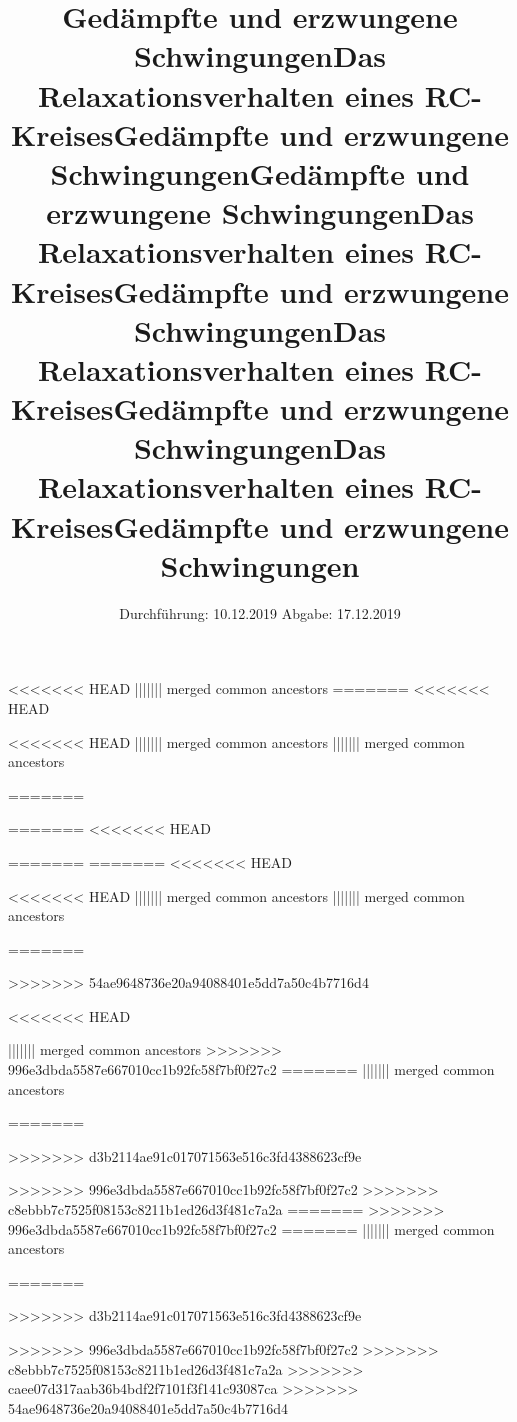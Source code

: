 

\subject{Versuch 354}
<<<<<<< HEAD
||||||| merged common ancestors
=======
<<<<<<< HEAD
\subject{Versuch 354}
\title{Gedämpfte und erzwungene Schwingungen}
<<<<<<< HEAD
||||||| merged common ancestors
||||||| merged common ancestors
\subject{Versuch 353}
\title{Das Relaxationsverhalten eines RC-Kreises}
=======
\subject{Versuch 353}
=======
<<<<<<< HEAD
\title{Gedämpfte und erzwungene Schwingungen}
=======
=======
<<<<<<< HEAD
\subject{Versuch 354}
\title{Gedämpfte und erzwungene Schwingungen}
<<<<<<< HEAD
||||||| merged common ancestors
||||||| merged common ancestors
\subject{Versuch 353}
\title{Das Relaxationsverhalten eines RC-Kreises}
=======
\subject{Versuch 353}
>>>>>>> 54ae9648736e20a94088401e5dd7a50c4b7716d4
\title{Gedämpfte und erzwungene Schwingungen}
<<<<<<< HEAD

||||||| merged common ancestors
>>>>>>> 996e3dbda5587e667010cc1b92fc58f7bf0f27c2
=======
||||||| merged common ancestors
\subject{Versuch 353}
\title{Das Relaxationsverhalten eines RC-Kreises}
=======
\subject{Versuch 353}
>>>>>>> d3b2114ae91c017071563e516c3fd4388623cf9e
\title{Gedämpfte und erzwungene Schwingungen}
>>>>>>> 996e3dbda5587e667010cc1b92fc58f7bf0f27c2
>>>>>>> c8ebbb7c7525f08153c8211b1ed26d3f481c7a2a
=======
>>>>>>> 996e3dbda5587e667010cc1b92fc58f7bf0f27c2
=======
||||||| merged common ancestors
\subject{Versuch 353}
\title{Das Relaxationsverhalten eines RC-Kreises}
=======
\subject{Versuch 353}
>>>>>>> d3b2114ae91c017071563e516c3fd4388623cf9e
\title{Gedämpfte und erzwungene Schwingungen}
>>>>>>> 996e3dbda5587e667010cc1b92fc58f7bf0f27c2
>>>>>>> c8ebbb7c7525f08153c8211b1ed26d3f481c7a2a
>>>>>>> caee07d317aab36b4bdf2f7101f3f141c93087ca
>>>>>>> 54ae9648736e20a94088401e5dd7a50c4b7716d4
\date{%
  Durchführung: 10.12.2019
  \hspace{3em}
  Abgabe: 17.12.2019
}



\maketitle
\thispagestyle{empty}
\tableofcontents
\newpage






\nocite{*}
\printbibliography{}


